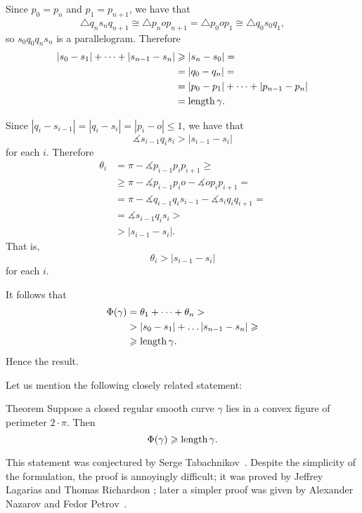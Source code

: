 Since $p_0=p_n$ and $p_1=p_{n+1}$, we have that
\[\triangle q_{n}s_nq_{n+1}\cong 
\triangle p_nop_{n+1}=\triangle p_0op_1\cong\triangle q_{0}s_0q_1,\]
so $s_0q_0q_ns_n$ is a parallelogram.
Therefore
\begin{align*}
|s_0-s_1|+\dots+|s_{n-1}-s_n|
&\geqslant|s_n-s_0|=
\\
&=|q_0-q_n|=
\\
&=|p_0-p_1|+\dots+|p_{n-1}-p_n|
\\
&=\mathop{\rm length}\nolimits \gamma.
\end{align*}

Since $|q_i-s_{i-1}|=|q_i-s_i|=|p_i-o|\le 1$, we have that
\[\measuredangle s_{i-1}q_is_i>|s_{i-1}-s_i|\]%
for each $i$.
Therefore
\begin{align*}
\theta_i&=\pi-\measuredangle p_{i-1}p_ip_{i+1}\ge
\\
&\ge\pi-\measuredangle p_{i-1}p_io-\measuredangle op_ip_{i+1}=
\\
&=\pi-\measuredangle q_{i-1}q_is_{i-1}-\measuredangle s_iq_iq_{i+1}=
\\
&=\measuredangle s_{i-1}q_is_i>
\\
&>|s_{i-1}-s_i|.
\end{align*}
That is, 
\[\theta_i>|s_{i-1}-s_i|\]
for each $i$.

It follows that
\begin{align*}
\Phi({\gamma})
&=\theta_1+\dots+\theta_n>
\\
&> |s_{0}-s_1|+\dots |s_{n-1}-s_n|\geqslant 
\\
&\geqslant\mathop{\rm length}\nolimits \gamma.
\end{align*}
Hence the result.
\qeds


Let us mention the following closely related statement:

\begin{thm}{Theorem}
Suppose a closed regular smooth curve $\gamma$ lies in a convex figure of perimeter $2\cdot \pi$.
Then 
\[\Phi({\gamma})\geqslant \mathop{\rm length}\nolimits\gamma.\]

\end{thm}

This statement was conjectured by Serge Tabachnikov~\cite{tabachnikov}.
Despite the simplicity of the formulation, the proof is annoyingly difficult;
it was proved by Jeffrey Lagarias and Thomas Richardson \cite{lagarias-richardso}; later a simpler proof was given by Alexander Nazarov and Fedor Petrov~\cite{nazarov-petrov}.

